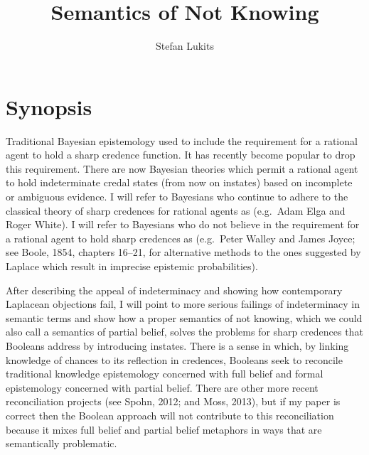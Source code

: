 \documentclass[11pt]{article}
\begin{document}
{}

\title{Semantics of Not Knowing}
\author{Stefan Lukits}
\date{}
\maketitle


\section{Synopsis}
\label{Synopsis}

Traditional Bayesian epistemology used to include the requirement for
a rational agent to hold a sharp credence function. It has recently
become popular to drop this requirement. There are now Bayesian
theories which permit a rational agent to hold indeterminate credal
states (from now on instates) based on incomplete or ambiguous
evidence. I will refer to Bayesians who continue to adhere to the
classical theory of sharp credences for rational agents as
 (e.g.\ Adam Elga and Roger White). I will refer to
Bayesians who do not believe in the requirement for a rational agent
to hold sharp credences as  (e.g.\ Peter Walley and
James Joyce; see Boole, 1854, chapters 16--21, for alternative methods
to the ones suggested by Laplace which result in imprecise epistemic
probabilities).

After describing the appeal of indeterminacy and showing how
contemporary Laplacean objections fail, I will point to more serious
failings of indeterminacy in semantic terms and show how a proper
semantics of not knowing, which we could also call a semantics of
partial belief, solves the problems for sharp credences that Booleans
address by introducing instates. There is a sense in which, by linking
knowledge of chances to its reflection in credences, Booleans seek to
reconcile traditional knowledge epistemology concerned with full
belief and formal epistemology concerned with partial belief. There
are other more recent reconciliation projects (see Spohn, 2012; and
Moss, 2013), but if my paper is correct then the Boolean approach will
not contribute to this reconciliation because it mixes full belief and
partial belief metaphors in ways that are semantically problematic.
\end{document}
